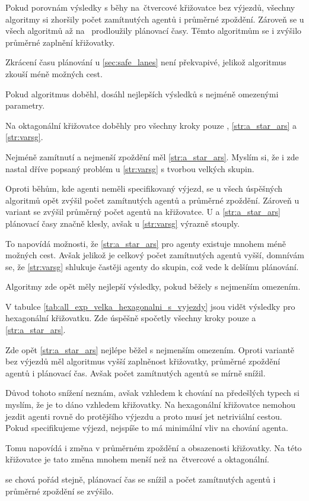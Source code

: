 Pokud porovnám výsledky s běhy na~čtvercové křižovatce bez výjezdů,
všechny algoritmy si zhoršily počet zamítnutých agentů i průměrné zpoždění.
Zároveň se u všech algoritmů až na~ prodloužily plánovací časy.
Těmto algoritmům se i zvýšilo průměrné zaplnění křižovatky.

Zkrácení času plánování u \ref{sec:safe_lanes} není překvapivé, jelikož algoritmus zkouší méně možných cest.

Pokud algoritmus doběhl, dosáhl nejlepších výsledků s nejméně omezenými parametry.



Na oktagonální křižovatce doběhly pro všechny kroky pouze
, \ref{str:a_star_ars} a \ref{str:varsg}.

Nejméně zamítnutí a nejmenší zpoždění měl \ref{str:a_star_ars}.
Myslím si, že i zde nastal dříve popsaný problém u \ref{str:varsg} s tvorbou velkých skupin.

Oproti běhům, kde agenti neměli specifikovaný výjezd,
se u všech úspěšných algoritmů opět zvýšil počet zamítnutých agentů a průměrné zpoždění.
Zároveň u  variant se zvýšil průměrný počet agentů na křižovatce.
U  a \ref{str:a_star_ars} plánovací časy značně klesly,
avšak u \ref{str:varsg} výrazně stouply.

To napovídá možnosti, že \ref{str:a_star_ars} pro agenty existuje mnohem méně možných cest.
Avšak jelikož je celkový počet zamítnutých agentů vyšší, domnívám se,
že \ref{str:varsg} shlukuje častěji agenty do skupin, což vede k delšímu plánování.

Algoritmy zde opět měly nejlepší výsledky, pokud běžely s nejmenším omezením.



V tabulce \ref{tab:all_exp_velka_hexagonalni_s_vyjezdy} jsou vidět výsledky pro hexagonální křižovatku.
Zde úspěšně spočetly všechny kroky pouze  a \ref{str:a_star_ars}.

Zde opět \ref{str:a_star_ars} nejlépe běžel s nejmenším omezením.
Oproti variantě bez výjezdů měl algoritmus vyšší zaplněnost křižovatky, průměrné zpoždění agentů i plánovací čas.
Avšak počet zamítnutých agentů se mírně snížil.

Důvod tohoto snížení neznám, avšak vzhledem k chování na předešlých typech si myslím,
že je to dáno vzhledem křižovatky.
Na hexagonální křižovatce nemohou jezdit agenti rovně do protějšího výjezdu a proto musí jet netriviální cestou.
Pokud specifikujeme výjezd, nejspíše to má minimální vliv na chování agenta.

Tomu napovídá i změna v průměrném zpoždění a obsazenosti křižovatky.
Na této křižovatce je tato změna mnohem menší než na~čtvercové a oktagonální.

 se chová pořád stejně, plánovací čas se snížil a
počet zamítnutých agentů i průměrné zpoždění se zvýšilo.


